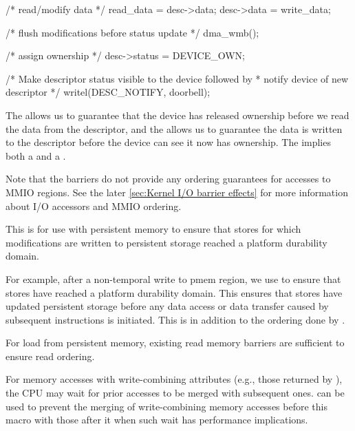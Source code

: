 \begin{description}[style=nextline]
\begin{VerbatimU}
{		/* read/modify data */
		read_data = desc->data;
		desc->data = write_data;

		/* flush modifications before status update */
		dma_wmb();

		/* assign ownership */
		desc->status = DEVICE_OWN;

		/* Make descriptor status visible to the device followed by
		 * notify device of new descriptor
		 */
		writel(DESC_NOTIFY, doorbell);
	}
\end{VerbatimU}

     The  allows us to guarantee that the device has released
     ownership before we read the data from the descriptor, and the
      allows us to guarantee the data is written to the
     descriptor before the device can see it now has ownership.
     The  implies both a  and a .

     Note that the  barriers do not provide any ordering
     guarantees for accesses to MMIO regions.
     See the later \cref{sec:Kernel I/O barrier effects} for more
     information about I/O accessors and MMIO ordering.

 \item[\tco{pmem_wmb()}]
     This is for use with persistent memory to ensure that stores for which
     modifications are written to persistent storage reached a platform
     durability domain.

     For example, after a non-temporal write to pmem region, we use
      to ensure that stores have reached a platform
     durability domain.
     This ensures that stores have updated persistent storage before any
     data access or data transfer caused by subsequent instructions is
     initiated.
     This is in addition to the ordering done by .

     For load from persistent memory, existing read memory barriers are
     sufficient to ensure read ordering.

 \item[\tco{io_stop_wc()}]
     For memory accesses with write-combining attributes (e.g., those returned
     by ), the CPU may wait for prior accesses to be merged
     with subsequent ones.
      can be used to prevent the merging of write-combining
     memory accesses before this macro with those after it when such wait
     has performance implications.
\end{description}


